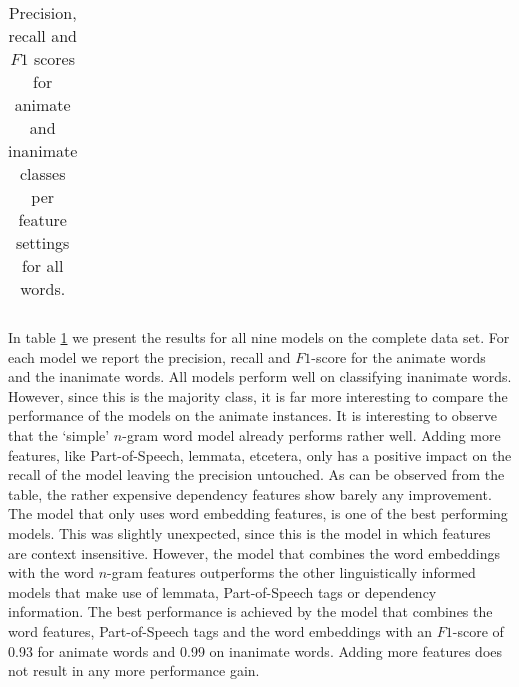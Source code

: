\documentclass[a4paper,UKenglish]{oasics}
\begin{document}
\begin{table}
\begin{tabular}{llrrrr}
\bottomrule
\end{tabular}
\caption{Precision, recall and $F1$ scores for animate and inanimate classes per feature settings for all words.}
\label{tab:results-all}
\end{table}


In table \ref{tab:results-all} we present the results for all nine
models on the complete data set. For each model we report the
precision, recall and $F1$-score for the animate words and the
inanimate words. All models perform well on classifying inanimate
words. However, since this is the majority class, it is far more
interesting to compare the performance of the models on the animate
instances. It is interesting to observe that the `simple' $n$-gram
word model already performs rather well. Adding more features, like
Part-of-Speech, lemmata, etcetera, only has a positive impact on the
recall of the model leaving the precision untouched. As can be
observed from the table, the rather expensive dependency features show
barely any improvement. The model that only uses word embedding
features, is one of the best performing models. This was slightly
unexpected, since this is the model in which features are context
insensitive. However, the model that combines the word embeddings with
the word $n$-gram features outperforms the other linguistically
informed models that make use of lemmata, Part-of-Speech tags or
dependency information. The best performance is achieved by the model
that combines the word features, Part-of-Speech tags and the word
embeddings with an $F1$-score of 0.93 for animate words and 0.99 on
inanimate words. Adding more features does not result in any more
performance gain.
\end{document}
